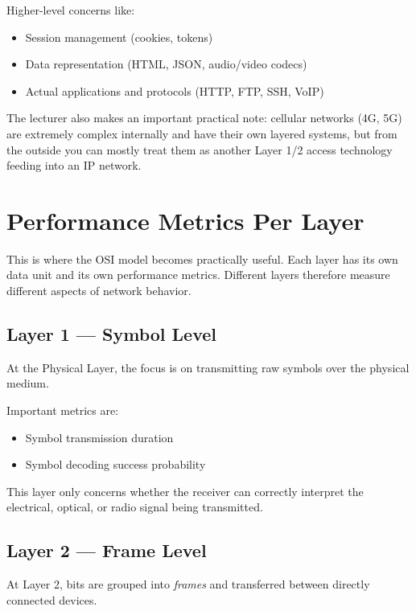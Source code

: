 Higher-level concerns like:
\begin{itemize}
    \item Session management (cookies, tokens)
    \item Data representation (HTML, JSON, audio/video codecs)
    \item Actual applications and protocols (HTTP, FTP, SSH, VoIP)
\end{itemize}

The lecturer also makes an important practical note: cellular networks (4G, 5G) are extremely complex internally and have their own layered systems, but from the outside you can mostly treat them as another Layer 1/2 access technology feeding into an IP network.

\section{Performance Metrics Per Layer}
This is where the OSI model becomes practically useful. Each layer has its own
data unit and its own performance metrics. Different layers therefore measure
different aspects of network behavior.

\subsection{Layer 1 --- Symbol Level}

At the Physical Layer, the focus is on transmitting raw symbols over the
physical medium.

Important metrics are:
\begin{itemize}[leftmargin=1.5em]
    \item Symbol transmission duration
    \item Symbol decoding success probability
\end{itemize}

This layer only concerns whether the receiver can correctly interpret the
electrical, optical, or radio signal being transmitted.

\subsection{Layer 2 --- Frame Level}

At Layer 2, bits are grouped into \emph{frames} and transferred between directly
connected devices.

